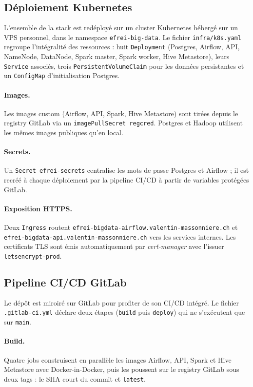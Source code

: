 \documentclass[11pt,a4paper]{article}
\begin{document}
\subsection{Déploiement Kubernetes}

L'ensemble de la stack est redéployé sur un cluster Kubernetes hébergé sur un VPS personnel, dans le namespace \texttt{efrei-big-data}. Le fichier \texttt{infra/k8s.yaml} regroupe l'intégralité des ressources : huit \texttt{Deployment} (Postgres, Airflow, API, NameNode, DataNode, Spark master, Spark worker, Hive Metastore), leurs \texttt{Service} associés, trois \texttt{PersistentVolumeClaim} pour les données persistantes et un \texttt{ConfigMap} d'initialisation Postgres.

\paragraph{Images.} Les images custom (Airflow, API, Spark, Hive Metastore) sont tirées depuis le registry GitLab via un \texttt{imagePullSecret regcred}. Postgres et Hadoop utilisent les mêmes images publiques qu'en local.

\paragraph{Secrets.} Un \texttt{Secret efrei-secrets} centralise les mots de passe Postgres et Airflow ; il est recréé à chaque déploiement par la pipeline CI/CD à partir de variables protégées GitLab.

\paragraph{Exposition HTTPS.} Deux \texttt{Ingress} routent \texttt{efrei-bigdata-airflow.valentin-massonniere.ch} et \texttt{efrei-bigdata-api.valentin-massonniere.ch} vers les services internes. Les certificats TLS sont émis automatiquement par \textit{cert-manager} avec l'issuer \texttt{letsencrypt-prod}.

\subsection{Pipeline CI/CD GitLab}

Le dépôt est miroiré sur GitLab pour profiter de son CI/CD intégré. Le fichier \texttt{.gitlab-ci.yml} déclare deux étapes (\texttt{build} puis \texttt{deploy}) qui ne s'exécutent que sur \texttt{main}.

\paragraph{Build.} Quatre jobs construisent en parallèle les images Airflow, API, Spark et Hive Metastore avec Docker-in-Docker, puis les poussent sur le registry GitLab sous deux tags : le SHA court du commit et \texttt{latest}.
\end{document}
